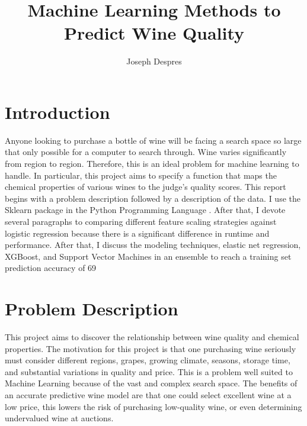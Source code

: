 \documentclass[16pt,twocolumn,letterpaper,titlepage]{article}
\title{Machine Learning Methods to Predict Wine Quality}
\author{
    Joseph Despres
}
\begin{document}
\maketitle


\onecolumn
\tableofcontents
\thispagestyle{empty}
\newpage
\twocolumn


\setcounter{page}{1}

\section{Introduction}


Anyone looking to purchase a bottle of wine will be facing a search space so large that only possible for a computer to search through. Wine varies significantly from region to region. Therefore, this is an ideal problem for machine learning to handle. In particular, this project aims to specify a function that maps the chemical properties of various wines to the judge's quality scores. This report begins with a problem description followed by a description of the data. I use the Sklearn package \cite{scikit-learn} in the Python Programming Language \cite{10.5555/1593511}. After that, I devote several paragraphs to comparing different feature scaling strategies against logistic regression because there is a significant difference in runtime and performance. After that, I discuss the modeling techniques, elastic net regression, XGBoost, and Support Vector Machines in an ensemble to reach a training set prediction accuracy of 69%

\section{Problem Description}


This project aims to discover the relationship between wine quality and chemical properties. The motivation for this project is that one purchasing wine seriously must consider different regions, grapes, growing climate, seasons, storage time, and substantial variations in quality and price. This is a problem well suited to Machine Learning because of the vast and complex search space. The benefits of an accurate predictive wine model are that one could select excellent wine at a low price, this lowers the risk of purchasing low-quality wine, or even determining undervalued wine at auctions.
\end{document}

